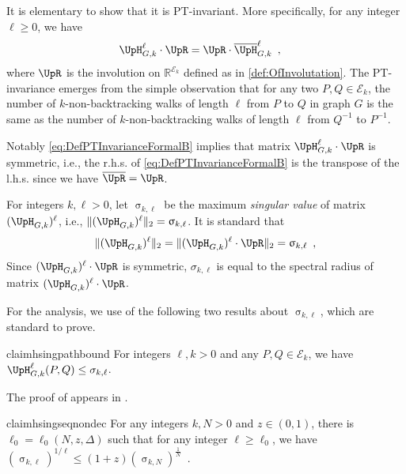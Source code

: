 \documentclass[11pt,reqno]{amsart}
\numberwithin{equation}{section}
\newcommand{\cE}{{\mathcal{E}}}
\newcommand{\applegreen}[1]{ {\color{applegreen}#1}}
\newcommand{\amethyst}[1]{{\color{amethyst}#1} }
\newcommand{\bluepigment}[1]{{\color{blue(pigment)}#1}}
\newcommand{\byzantine}[1]{{\color{byzantine}#1}}
\newcommand{\cadmiumgreen}[1]{{\color{cadmiumgreen}#1}}
\newcommand{\goldenbrown}[1]{{\color{goldenbrown}#1}}
\newcommand{\iris}[1]{{\color{iris}#1}}
\newcommand{\maxDeg}{{\Delta}}
\newcommand{\ExtV}{\iris{\cE}}
\newcommand{\norm}[2]{\goldenbrown{\|} #1 \goldenbrown{\|}_{#2}}
\newcommand{\MTR}[1]{\overline{#1}}
\newcommand{\NBMatrix}{\cadmiumgreen{\UpH}_{G,\kk}}
\newcommand{\NBMatrixE}{\byzantine{\UpH}}
\newcommand{\Invol}{\UpR}
\renewcommand{\applegreen}[1]{#1}
\renewcommand{\amethyst}[1]{#1}
\renewcommand{\bluepigment}[1]{#1}
\renewcommand{\byzantine}[1]{#1}
\renewcommand{\cadmiumgreen}[1]{#1}
\renewcommand{\goldenbrown}[1]{#1}
\renewcommand{\iris}[1]{#1}
\newcommand{\kk}{\bluepigment{k}}
\newcommand{\kell}{{\color{green(pigment)}\ell}}%
\newcommand{\kP}{\goldenbrown{P}}
\newcommand{\kQ}{\amethyst{Q}}
\newcommand{\kz}{\cadmiumgreen{z}}
\renewcommand{\kk}{k}
\renewcommand{\kell}{\ell}
\renewcommand{\kP}{P}
\renewcommand{\kQ}{Q}
\renewcommand{\kz}{z}
\newcommand{\hsingular}{\upsigma}
\begin{document}
It is elementary to show that it is PT-invariant. More specifically, for any integer $\kell\geq 0$, we have 
\begin{align}\label{eq:DefPTInvarianceFormalB}
\NBMatrix^{\kell} \cdot \Invol &= \Invol \cdot\MTR{\NBMatrixE}^{\kell}_{G,\kk}\enspace,
\end{align}
where $\Invol $ is the involution on $\mathbb{R}^{\ExtV_{\kk}}$ defined as in \eqref{def:OfInvolutation}. 
%
The PT-invariance emerges from the simple observation that for any two $\kP,\kQ \in \ExtV_{k}$, 
the number of $\kk$-non-backtracking walks of length $\kell$ from $\kP$ to $\kQ$ in graph $G$ is the
same as the number of $\kk$-non-backtracking walks of length $\kell$ from $\kQ^{-1}$ to $\kP^{-1}$. 


Notably \eqref{eq:DefPTInvarianceFormalB} implies that 
matrix $\NBMatrix^{\kell} \cdot \Invol$ is symmetric, i.e., the r.h.s. of \eqref{eq:DefPTInvarianceFormalB} is
the transpose of the l.h.s. since we have $\MTR{\Invol}={\Invol}$. 


 
 

For integers $\kk,\kell>0$, let $\hsingular_{\kk,\kell}$ be the maximum {\em singular value} of matrix 
$(\NBMatrix)^{\kell}$, i.e., $\norm{ (\NBMatrix)^{\kell}}{2}=\hsingular_{\kk,\kell}$. 
%
It is standard that 
\begin{align}
\norm{(\NBMatrix)^{\kell}}{2}=\norm{ (\NBMatrix)^{\kell} \cdot \Invol}{2}=\hsingular_{\kk,\kell}\enspace,
\end{align}
% 
%
Since $(\NBMatrix)^{\kell}\cdot \Invol$ is symmetric, 
 $\sigma_{\kk,\kell}$ is equal to the spectral radius of matrix $(\NBMatrix)^{\kell}\cdot \Invol$. 

For the analysis, we use of the following two results about $\hsingular_{\kk,\kell}$, which are standard to prove. 




\begin{restatable}{claim}{hsingpathbound}\label{claim:SigmaLVsPathNumber}
For integers $\kell,\kk>0$ and any $\kP,\kQ \in \ExtV_{\kk}$, we have 
$\NBMatrix^{\kell}(\kP,\kQ) \leq \sigma_{\kk,\kell}$.
\end{restatable}

The proof of  appears in .




\begin{restatable}{claim}{hsingseqnondec}\label{lemma:SingSequenConv}
% 
For any integers $\kk,N>0$ and $\kz\in (0,1)$, there is $\ell_0=\ell_0(N,\kz,\maxDeg)$ such that 
%
for any integer $\kell\geq \ell_{0}$, we have
$\left( \hsingular_{\kk,\kell} \right)^{1/\kell} \leq (1+\kz) (\hsingular_{\kk,N})^{\frac{1}{N}}\enspace. $
\end{restatable}
\end{document}
